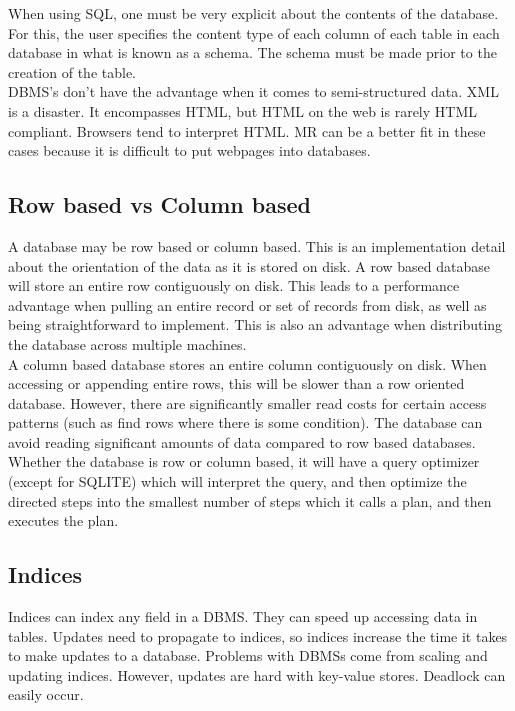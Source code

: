 \documentclass[twoside]{article}
\begin{document}
When using SQL, one must be very explicit about the contents of the database. For this, the user specifies the content type of each column of each table in each database in what is known as a schema. The schema must be made prior to the creation of the table. \\
DBMS's don't have the advantage when it comes to semi-structured data. XML is a disaster. It encompasses HTML, but HTML on the web is rarely HTML compliant. Browsers tend to interpret HTML. MR can be a better fit in these cases because it is difficult to put webpages into databases.



\subsection{Row based vs Column based}
A database may be row based or column based. This is an implementation detail about the orientation of the data as it is stored on disk. A row based database will store an entire row contiguously on disk. This leads to a performance advantage when pulling an entire record or set of records from disk, as well as being straightforward to implement. This is also an advantage when distributing the database across multiple machines.\\
A column based database stores an entire column contiguously on disk. When accessing or appending entire rows, this will be slower than a row oriented database. However, there are significantly smaller read costs for certain access patterns (such as find rows where there is some condition). The database can avoid reading significant amounts of data compared to row based databases.\\ Whether the database is row or column based, it will have a query optimizer (except for SQLITE) which will interpret the query, and then optimize the directed steps into the smallest number of steps which it calls a plan, and then executes the plan. 

\subsection{Indices}
Indices can index any field in a DBMS. They can speed up accessing data in tables. Updates need to propagate to indices, so indices increase the time it takes to make updates to a database. Problems with DBMSs come from scaling and updating indices. However, updates are hard with key-value stores. Deadlock can easily occur. 
\end{document}
